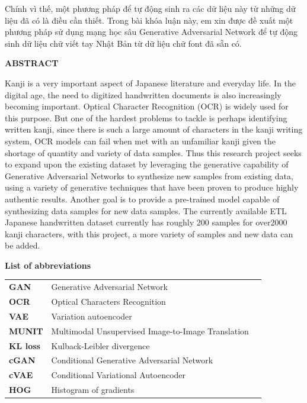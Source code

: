 \documentclass[12pt]{report}
\begin{document}
Chính vì thế, một phương pháp để tự động sinh ra các dữ liệu này từ những dữ liệu đã có là điều cần thiết. Trong bài khóa luận này, em xin được đề xuất một phương pháp sử dụng mạng học sâu Generative Adversarial Network để tự động sinh dữ liệu chữ viết tay Nhật Bản từ dữ liệu chữ font đã sẵn có.

\newpage
\begin{center}
	\textbf{\large ABSTRACT}
\end{center}
Kanji is a very important aspect of Japanese literature and everyday life. In the digital age, the need to digitized handwritten documents is also increasingly becoming important. Optical Character Recognition (OCR) is widely used for this purpose. But one of the hardest problems to tackle is perhaps identifying written kanji, since there is such a large amount of characters in the kanji writing system, OCR models can fail when met with an unfamiliar kanji given the shortage of quantity and variety of data samples. Thus this research project seeks to expand upon the existing dataset by leveraging the generative capability of Generative Adversarial Networks to synthesize new samples from existing data, using a variety of generative techniques that have been proven to produce highly authentic results. Another goal is to provide a pre-trained model capable of synthesizing data samples for new data samples. The currently available ETL Japanese handwritten dataset \cite{etl} currently has roughly 200 samples for over2000 kanji characters, with this project, a more variety of samples and new data can be added.

\newpage
\tableofcontents

\newpage
{}
\listoftables

\newpage
{}
\begin{flushleft}
\bfseries{\Huge{List of abbreviations}}
\end{flushleft}
\begin{table}[h]
	\centering
	\begin{tabular}{lll}
		\textbf{GAN}  & Generative Adversarial Network\\[0.3cm]
		\textbf{OCR}  & Optical Characters Recognition              \\[0.3cm]
		\textbf{VAE} & Variation autoencoder \\[0.3cm]
		\textbf{MUNIT} & Multimodal Unsupervised Image-to-Image Translation \\[0.3cm]	
		\textbf{KL loss} & Kulback-Leibler divergence \\[0.3cm]
		\textbf{cGAN} & Conditional Generative Adversarial Network \\[0.3cm]
		\textbf{cVAE} & Conditional Variational Autoencoder \\[0.3cm]
		\textbf{HOG} & Histogram of gradients \\[0.3cm]
	\end{tabular}
\end{table}
\end{document}

